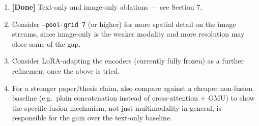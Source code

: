 \documentclass[11pt]{article}
\begin{document}
\begin{enumerate}[nosep]
    \item \textbf{[Done]} Text-only and image-only ablations --- see Section 7.
    \item Consider \texttt{--pool-grid 7} (or higher) for more spatial detail on the image streams, since image-only is the weaker modality and more resolution may close some of the gap.
    \item Consider LoRA-adapting the encoders (currently fully frozen) as a further refinement once the above is tried.
    \item For a stronger paper/thesis claim, also compare against a cheaper non-fusion baseline (e.g.\ plain concatenation instead of cross-attention + GMU) to show the specific fusion mechanism, not just multimodality in general, is responsible for the gain over the text-only baseline.
\end{enumerate}
\end{document}
